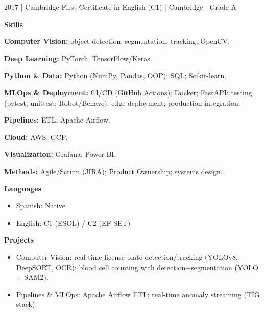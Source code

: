 \documentclass[11pt]{article}
\begin{document}
2017 | Cambridge First Certificate in English (C1) | Cambridge | Grade A

\vspace{12pt}

\begin{center}
    \textbf{Skills}
\end{center}

\textbf{Computer Vision:} object detection, segmentation, tracking; OpenCV.

\textbf{Deep Learning:} PyTorch; TensorFlow/Keras.

\textbf{Python \& Data:} Python (NumPy, Pandas, OOP); SQL; Scikit-learn.

\textbf{MLOps \& Deployment:} CI/CD (GitHub Actions); Docker; FastAPI; testing (pytest, unittest; Robot/Behave); edge deployment; production integration.

\textbf{Pipelines:} ETL; Apache Airflow.

\textbf{Cloud:} AWS, GCP.

\textbf{Visualization:} Grafana; Power BI.

\textbf{Methods:} Agile/Scrum (JIRA); Product Ownership; systems design.

\vspace{12pt}

\begin{center}
    \textbf{Languages}
\end{center}

\begin{itemize}[noitemsep, topsep=0pt, partopsep=0pt, parsep=0pt]
    \item Spanish: Native
    \item English: C1 (ESOL) / C2 (EF SET)
\end{itemize}

\vspace{12pt}

\begin{center}
    \textbf{Projects}
\end{center}

\begin{itemize}[noitemsep, topsep=0pt, partopsep=0pt, parsep=0pt]
    \item Computer Vision: real-time license plate detection/tracking (YOLOv8, DeepSORT, OCR); blood cell counting with detection+segmentation (YOLO + SAM2).
    \item Pipelines \& MLOps: Apache Airflow ETL; real-time anomaly streaming (TIG stack).
\end{itemize}
\end{document}
